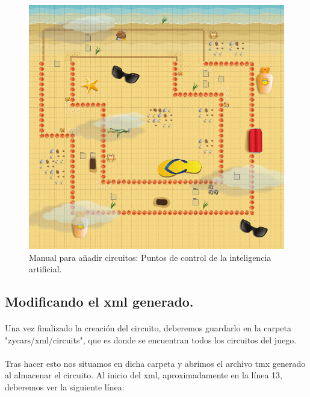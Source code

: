 \begin{figure}[H]
  \label{ia_check}
  \begin{center}
    \includegraphics[scale=0.5]{imagenes/manualcircuito/ia_check.png}
  \end{center}
  \caption{Manual para añadir circuitos: Puntos de control de la inteligencia artificial.}
\end{figure}

\subsection{Modificando el xml generado.}

\paragraph{}
Una vez finalizado la creación del circuito, deberemos guardarlo en la carpeta "zycars/xml/circuits", que es donde se encuentran 
todos los circuitos del juego.

\paragraph{}
Tras hacer esto nos situamos en dicha carpeta y abrimos el archivo tmx generado al almacenar el circuito. Al inicio del xml,
aproximadamente en la línea 13, deberemos ver la siguiente línea:

